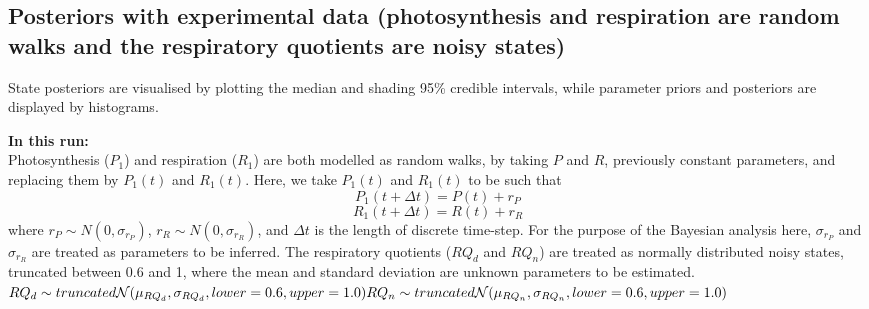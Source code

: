 \documentclass{ruthesis}
\begin{document}
\FloatBarrier
\subsection{Posteriors with experimental data (photosynthesis and respiration are random walks and the respiratory quotients are noisy states)}

State posteriors are visualised by plotting the median and shading 95\% credible intervals, while parameter priors and posteriors are displayed by histograms.

\textbf{In this run:}\\
Photosynthesis ($P_1$) and respiration ($R_1$) are both modelled as random walks, by taking \begin{math}P\end{math} and \begin{math}R\end{math}, previously constant parameters, and replacing them by \begin{math}P_1(t)\end{math} and \begin{math}R_1(t)\end{math}. Here, we take \begin{math}P_1(t)\end{math} and \begin{math}R_1(t)\end{math} to be such that
\begin{displaymath}
P_1(t+\Delta t) = P(t) + r_P
\end{displaymath}
\begin{displaymath}
R_1(t+\Delta t) = R(t) + r_R
\end{displaymath}
where \begin{math}
r_P \sim N(0, \sigma_{r_P})
\end{math}, \begin{math}
r_R \sim N(0, \sigma_{r_R})
\end{math}, and \begin{math}
\Delta t
\end{math} is the length of discrete time-step. For the purpose of the Bayesian analysis here, \begin{math}\sigma_{r_P}\end{math} and \begin{math}\sigma_{r_R}\end{math} are treated as parameters to be inferred.  
The respiratory quotients ($RQ_d$ and $RQ_n$) are treated as normally distributed noisy states, truncated between 0.6 and 1, where the mean and standard deviation are unknown parameters to be estimated. 
$
RQ_d \sim truncated\mathcal{N}(\mu_{RQ_d}, \sigma_{RQ_d}, lower = 0.6, upper = 1.0) \\
RQ_n \sim truncated\mathcal{N}(\mu_{RQ_n}, \sigma_{RQ_n}, lower = 0.6, upper = 1.0) \\ $
\end{document}
